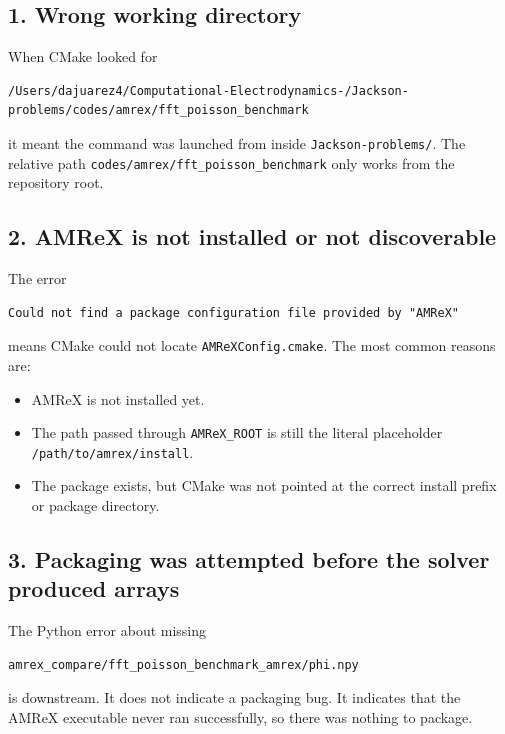 \documentclass[11pt]{article}
\begin{document}
\subsection*{1. Wrong working directory}
When CMake looked for
\begin{verbatim}
/Users/dajuarez4/Computational-Electrodynamics-/Jackson-problems/codes/amrex/fft_poisson_benchmark
\end{verbatim}
it meant the command was launched from inside \texttt{Jackson-problems/}. The relative path \texttt{codes/amrex/fft\_poisson\_benchmark} only works from the repository root.

\subsection*{2. AMReX is not installed or not discoverable}
The error
\begin{verbatim}
Could not find a package configuration file provided by "AMReX"
\end{verbatim}
means CMake could not locate \texttt{AMReXConfig.cmake}. The most common reasons are:
\begin{itemize}
\item AMReX is not installed yet.
\item The path passed through \texttt{AMReX\_ROOT} is still the literal placeholder \texttt{/path/to/amrex/install}.
\item The package exists, but CMake was not pointed at the correct install prefix or package directory.
\end{itemize}

\subsection*{3. Packaging was attempted before the solver produced arrays}
The Python error about missing
\begin{verbatim}
amrex_compare/fft_poisson_benchmark_amrex/phi.npy
\end{verbatim}
is downstream. It does not indicate a packaging bug. It indicates that the AMReX executable never ran successfully, so there was nothing to package.
\end{document}
